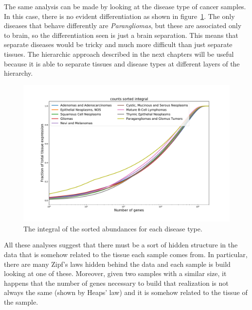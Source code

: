 The same analysis can be made by looking at the disease type of cancer samples. In this case, there is no evident differentiation as shown in figure~\ref{fig:structure/tcga/fraction_of_trascriptome_disease}. The only diseases that behave differently are \textit{Parangliomas}, but these are associated only to brain, so the differentiation seen is just a brain separation. This means that separate diseases would be tricky and much more difficult than just separate tissues. The hierarchic approach described in the next chapters will be useful because it is able to separate tissues and disease types at different layers of the hierarchy.
\begin{figure}[htb!]
  \centering
  \includegraphics[width=0.8\linewidth]{pictures/structure/tcga/fraction_of_trascriptome_disease.pdf}
  \caption{The integral of the sorted abundances for each disease type.}
  \label{fig:structure/tcga/fraction_of_trascriptome_disease}
\end{figure}

\FloatBarrier
All these analyses suggest that there must be a sort of hidden structure in the data that is somehow related to the tissue each sample comes from. In particular, there are many Zipf's laws hidden behind the data and each sample is build looking at one of these. Moreover, given two samples with a similar size, it happens that the number of genes necessary to build that realization is not always the same (shown by Heaps' law) and it is somehow related to the tissue of the sample.